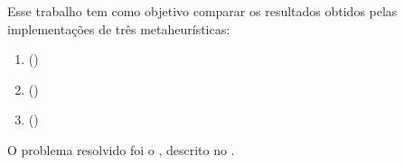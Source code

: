 Esse trabalho tem como objetivo comparar os resultados obtidos pelas implementações de três metaheurísticas:

\begin{enumerate}
    \item \graspfull (\grasp) \cite{bib:grasp}
    \item \tabufull (\tabu) \cite{bib:tabu}
    \item \geneticfull (\genetic) \cite{bib:genetic}
\end{enumerate}

O problema resolvido foi o \maxkqbffull, descrito no .
